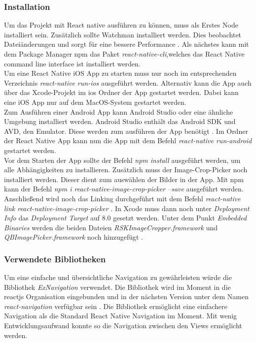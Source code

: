         \subsubsection{Installation}
Um das Projekt mit React native ausführen zu können, muss als Erstes Node installiert sein. Zusätzlich sollte Watchman installiert werden. Dies beobachtet Dateiänderungen und sorgt für eine bessere Performance \cite{facebook_inc._start_2017}.  Als nächstes kann mit dem Package Manager npm das Paket \textit{react-native-cli},welches das  React Native command line interface ist installiert werden. \\

Um eine React Native iOS App zu starten muss nur noch im entsprechenden Verzeichnis \textit{react-native run-ios} ausgeführt werden. Alternativ kann die App auch über das Xcode-Projekt im ios Ordner der App gestartet werden. Dabei kann eine iOS App nur auf dem MacOS-System gestartet werden. \cite{facebook_inc._start_2017}\\

Zum Ausführen einer Android App kann Android Studio oder eine ähnliche Umgebung installiert werden. Android Studio enthält das Android SDK und AVD, den Emulator. Diese werden zum ausführen der App benötigt \cite{facebook_inc._start_2017}. Im Ordner der React Native App kann nun die App mit dem Befehl \textit{react-native run-android} gestartet werden. \\

Vor dem Starten der App sollte der Befehl \textit{npm install} ausgeführt werden, um alle Abhängigkeiten zu installieren. Zusätzlich muss der Image-Crop-Picker noch installiert werden. Dieser dient zum auswählen der Bilder in der App. Mit npm kann der Befehl \textit{npm i react-native-image-crop-picker --save} ausgeführt werden. Anschließend wird noch das Linking durchgeführt mit dem Befehl \textit{react-native link react-native-image-crop-picker} \cite{pusic_crop_2017}. In Xcode muss dann noch unter \textit{Deployment Info} das \textit{Deployment Target} auf 8.0 gesetzt werden. Unter dem Punkt \textit{Embedded Binaries} werden die beiden Dateien \textit{RSKImageCropper.framework} und \textit{QBImagePicker.framework} noch hinzugefügt \cite{pusic_crop_2017}. 

        \subsubsection{Verwendete Bibliotheken}
Um eine einfache und übersichtliche  Navigation zu gewährleisten würde die Bibliothek \textit{ExNavigation} verwendet. Die Bibliothek wird im Moment in die reactjs Organisation eingebunden und in der nächsten Version unter dem Namen \textit{react-navigation} verfügbar sein \cite{Vatne_exnavigation_2017}. Die Bibliothek ermöglicht eine einfachere Navigation als die Standard React Native Navigation im Moment. Mit wenig Entwicklungsaufwand konnte so die Navigation zwischen den Views ermöglicht werden. \\

